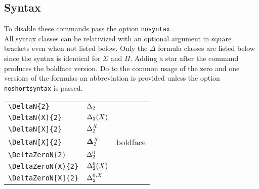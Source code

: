 \documentclass[leqno,11pt]{amsart}
\newcommand{\tab}{\hspace{1cm}}
\begin{document}
\subsection{Syntax}
To disable these commands pass the option \verb=nosyntax=.\\  All syntax classes can be relativized with an optional argument in square brackets even when not listed below.  Only the \( \Delta \) formula classes are listed below since the syntax is identical for \( \Sigma \) and \( \Pi \). Adding a star after the command produces the boldface version.  Do to the common usage of the zero and one versions of the formulas an abbreviation is provided unless the option \verb=noshortsyntax= is passed.


\begin{xtabular}{l |  l | l}\toprule
	\verb=\DeltaN{2}=              & \( \DeltaN{2}        \)      & \\ 
	\tab \verb=\DeltaN(X){2}=           & \( \DeltaN(X){2}     \)      & \\ 
	\tab \verb=\DeltaN[X]{2}=           & \( \DeltaN[X]{2}     \)      & \\
	\tab \verb=\DeltaN[X]{2}=           & \( \DeltaN*[X]{2}     \)      &  boldface  \\ \midrule
	\verb=\DeltaZeroN{2}=                   & \( \DeltaZeroN{2}        \)      & \\ 
	\tab \verb=\DeltaZeroN(X){2}=           & \( \DeltaZeroN(X){2}     \)      & \\ 
	\tab \verb=\DeltaZeroN[X]{2}=           & \( \DeltaZeroN[X]{2}     \)      & \\

\end{xtabular}
\end{document}
